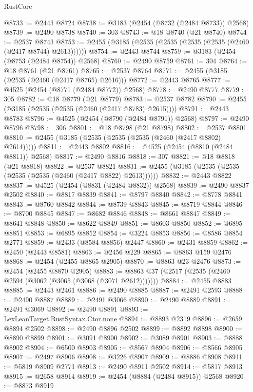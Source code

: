 \begin{lexlean}{RustCore}
\begin{coremodule}
@8733 := @2443 @8724
@8738 := @3183 (@2454 (@8732 (@2484 @8733)) @2568)
@8739 := @2490 @8738
@8740 := 303
@8743 := @18 @8740 (@21 @8740)
@8744 := @2537 @8743
@8753 := @2455 (@3185 (@2535 (@2535 (@2535 (@2535 (@2460 (@2417 @8744) @2613))))))
@8754 := @2443 @8744
@8759 := @3183 (@2454 (@8753 (@2484 @8754)) @2568)
@8760 := @2490 @8759
@8761 := 304
@8764 := @18 @8761 (@21 @8761)
@8765 := @2537 @8764
@8771 := @2455 (@3185 (@2535 (@2460 (@2417 @8765) @2616)))
@8772 := @2443 @8765
@8777 := @4525 (@2454 (@8771 (@2484 @8772)) @2568)
@8778 := @2490 @8777
@8779 := 305
@8782 := @18 @8779 (@21 @8779)
@8783 := @2537 @8782
@8790 := @2455 (@3185 (@2535 (@2535 (@2460 (@2417 @8783) @2615))))
@8791 := @2443 @8783
@8796 := @4525 (@2454 (@8790 (@2484 @8791)) @2568)
@8797 := @2490 @8796
@8798 := 306
@8801 := @18 @8798 (@21 @8798)
@8802 := @2537 @8801
@8810 := @2455 (@3185 (@2535 (@2535 (@2535 (@2460 (@2417 @8802) @2614)))))
@8811 := @2443 @8802
@8816 := @4525 (@2454 (@8810 (@2484 @8811)) @2568)
@8817 := @2490 @8816
@8818 := 307
@8821 := @18 @8818 (@21 @8818)
@8822 := @2537 @8821
@8831 := @2455 (@3185 (@2535 (@2535 (@2535 (@2535 (@2460 (@2417 @8822) @2613))))))
@8832 := @2443 @8822
@8837 := @4525 (@2454 (@8831 (@2484 @8832)) @2568)
@8839 := @2490 @8837 @2502
@8840 := @8817 @8839
@8841 := @8797 @8840
@8842 := @8778 @8841
@8843 := @8760 @8842
@8844 := @8739 @8843
@8845 := @8719 @8844
@8846 := @8700 @8845
@8847 := @8682 @8846
@8848 := @8661 @8847
@8849 := @8641 @8848
@8850 := @8622 @8849
@8851 := @8603 @8850
@8852 := @6895 @8851
@8853 := @6895 @8852
@8854 := @3224 @8853
@8856 := @8586 @8854 @2771
@8859 := @2433 (@8584 @8856) @2447
@8860 := @2431 @8859
@8862 := @2450 (@2443 @8581)
@8863 := @2456 @229
@8865 := @8863 @159 @2476
@8868 := @2454 (@2455 @8865 @2905)
@8870 := @8863 @23 @2476
@8873 := @2454 (@2455 @8870 @2905)
@8883 := @8863 @37 (@2517 (@2535 (@2460 @2594 (@3062 (@3065 (@3068 (@3071 @2612)))))))
@8884 := @2455 @8883
@8885 := @2443 @2461
@8886 := @2490 @8885
@8887 := @2491 @2593
@8888 := @2490 @8887
@8889 := @2491 @3066
@8890 := @2490 @8889
@8891 := @2491 @3069
@8892 := @2490 @8891
@8893 := LexLeanTarget.RustSyntax.Ctor.none
@8894 := @8893 @2319
@8896 := @2659 @8894 @2502
@8898 := @2490 @8896 @2502
@8899 := @8892 @8898
@8900 := @8890 @8899
@8901 := @3091 @8900
@8902 := @3089 @8901
@8903 := @8888 @8902
@8904 := @6500 @8903
@8905 := @8567 @8904
@8906 := @8566 @8905
@8907 := @2497 @8906
@8908 := @3226 @8907
@8909 := @8886 @8908
@8911 := @5819 @8909 @2771
@8913 := @2490 @8911 @2502
@8914 := @5817 @8913
@8915 := @2658 @8914
@8919 := @2454 (@8884 (@2484 @8915)) @2568
@8920 := @8873 @8919

\end{coremodule}
\end{lexlean}
